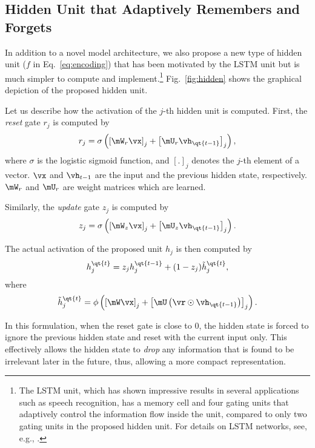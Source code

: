 \subsection{Hidden Unit that Adaptively Remembers and Forgets}

In addition to a novel model architecture, we also propose a new type of
hidden unit ($f$ in Eq.~\eqref{eq:encoding}) that has been motivated by the LSTM unit
but is much simpler to compute and implement.\footnote{
    The LSTM unit, which has shown impressive results in several applications
    such as speech recognition, has a memory cell and four gating units that
    adaptively control the information flow inside the unit, compared to only
    two gating units in the proposed hidden unit. For details on LSTM networks,
    see, e.g., \mbox{\cite{Graves-book2012}}.
}
Fig.~\mbox{\ref{fig:hidden}} shows the
graphical depiction of the proposed hidden unit.

Let us describe how the activation of the $j$-th hidden unit is computed. First, the
\textit{reset} gate $r_j$ is computed by
\begin{align}
    \label{eq:reset}
    r_j = \sigma\left( \left[ \mW_r \vx \right]_j + \left[\mU_r \vh_{\qt{t-1}}\right]_j \right),
\end{align}
where $\sigma$ is the logistic sigmoid function, and $\left[ . \right]_j$ denotes
the $j$-th element of a vector. $\vx$ and $\vh_{t-1}$ are the input and the
previous hidden state, respectively. $\mW_r$ and $\mU_r$ are weight matrices
which are learned.

Similarly, the \textit{update} gate $z_j$ is computed by
\begin{align}
    \label{eq:update}
    z_j = \sigma\left( \left[ \mW_z \vx \right]_j + \left[\mU_z \vh_{\qt{t-1}}\right]_j \right).
\end{align}

The actual activation of the proposed unit $h_j$ is then computed by
\begin{align}
    \label{eq:activation}
    h_j^{\qt{t}} = z_j h_j^{\qt{t-1}} + (1 - z_j) \tilde{h}_j^{\qt{t}},
\end{align}
where
\begin{align}
    \label{eq:preact}
    \tilde{h}_j^{\qt{t}} = \phi\left( 
    \left[ \mW \vx \right]_j + \left[ \mU \left( \vr \odot \vh_{\qt{t-1}} \right) \right]_j
    \right).
\end{align}

In this formulation, when the reset gate is close to 0, the hidden state is
forced to ignore the previous hidden state and reset with the current input
only. This effectively allows the hidden state to \textit{drop} any information
that is found to be irrelevant later in the future, thus, allowing a more
compact representation.  


